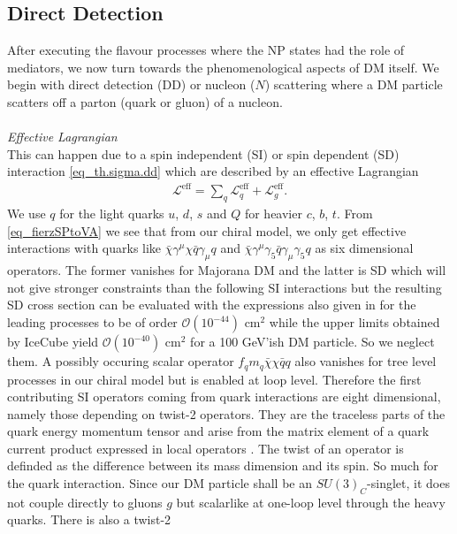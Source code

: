 \subsection{Direct Detection}
\label{sec_ddphen}
After executing the flavour processes where the NP states had the role of mediators, we now turn towards the phenomenological aspects of DM itself.
We begin with direct detection (DD) or nucleon ($N$) scattering where a DM particle scatters off a parton (quark or gluon) of a nucleon. 
\\ \\ \textit{Effective Lagrangian}\\
This can happen
due to a spin independent (SI) or spin dependent (SD) interaction \eqref{eq_th.sigma.dd} which are described by an effective Lagrangian \cite{1104.0228}
\begin{align}
 \mathcal{L}^\text{eff} = \sum\limits_{q} \mathcal{L}^\text{eff}_q + \mathcal{L}^\text{eff}_g.
\end{align}
We use $q$ for the light quarks $u$, $d$, $s$ and $Q$ for heavier $c$, $b$, $t$. From \eqref{eq_fierzSPtoVA} we see that from our chiral model, 
we only get effective interactions with quarks like $\bar \chi\gamma^\mu\chi \bar q\gamma_\mu q$ and $\bar \chi\gamma^\mu\gamma_5 \bar q\gamma_\mu \gamma_5 q$
as six dimensional operators. The former vanishes for Majorana DM and the latter is SD which will not give stronger constraints than the following SI
interactions but the resulting SD cross section can be evaluated with the expressions also given in \cite{1104.0228} for the leading processes to be of
order $\mathcal{O}(10^{-44})$ cm$^2$ while the upper limits obtained by IceCube \cite{1212.4097} yield $\mathcal{O}(10^{-40})$ cm$^2$ for 
a 100 GeV'ish DM particle.
So we neglect them. A possibly occuring scalar operator $f_q m_q\bar \chi \chi \bar q q$ also vanishes for tree level processes in our chiral model
but is enabled at loop level. Therefore the first contributing
SI operators coming from quark interactions are eight dimensional, namely those depending on twist-2 operators. They are the traceless parts of the
quark energy momentum tensor and arise from the matrix element of a quark current product expressed in local operators \cite{MDSchwartz}. The twist of 
an operator is definded as the difference between its mass dimension and its spin. So much for the quark interaction. Since our DM particle shall be an 
$SU(3)_C$-singlet, it does not couple directly to gluons $g$ but scalarlike at one-loop level through the heavy quarks. There is also a twist-2 
